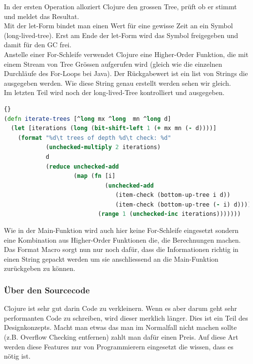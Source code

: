 \documentclass{fancydocument}
\begin{document}
In der ersten Operation alloziert Clojure den grossen Tree, prüft
ob er stimmt und meldet das Resultat.
\\
Mit der let-Form bindet man einen Wert f\"ur eine gewisse Zeit an ein Symbol
(long-lived-tree). Erst am Ende der let-Form wird das Symbol freigegeben und damit f\"ur den GC frei.
\\
Anstelle einer For-Schleife verwendet Clojure eine Higher-Order Funktion,
die mit einem Stream von Tree Gr\"ossen aufgerufen wird (gleich wie
die einzelnen Durchl\"aufe des For-Loops bei Java). Der Rückgabewert
ist ein list von Strings die ausgegeben werden. Wie diese String genau
erstellt werden sehen wir gleich.
\\
Im letzten Teil wird noch der long-lived-Tree kontrolliert und
ausgegeben.

\begin{lstlisting}[language=Clojure,caption=Clojure Worker-Funktion]{}
(defn iterate-trees [^long mx ^long  mn ^long d]
  (let [iterations (long (bit-shift-left 1 (+ mx mn (- d))))]
    (format "%d\t trees of depth %d\t check: %d"
            (unchecked-multiply 2 iterations)
            d
            (reduce unchecked-add
                    (map (fn [i]
                             (unchecked-add
                                (item-check (bottom-up-tree i d))
                                (item-check (bottom-up-tree (- i) d))))
                           (range 1 (unchecked-inc iterations)))))))
\end{lstlisting}

Wie in der Main-Funktion wird auch hier keine For-Schleife eingesetzt
sondern eine Kombination aus Higher-Order Funktionen die, die
Berechnungen machen. Das Format Macro sorgt nun nur noch
daf\"ur, dass die Informationen richtig in einen String gepackt werden um
sie anschliessend an die Main-Funktion zurückgeben zu können.

\subsubsection{\"Uber den Sourcecode}

Clojure ist sehr gut darin Code zu verkleinern. Wenn es aber darum geht sehr performanten  Code zu schreiben, wird dieser merklich l\"anger. Dies
ist ein Teil des Designkonzepts. Macht man etwas das man im Normalfall
nicht machen sollte (z.B. Overflow Checking entfernen) zahlt man
daf\"ur einen Preis. Auf diese Art werden diese Features nur von Programmierern
eingesetzt die wissen, dass es n\"otig ist.
\end{document}
